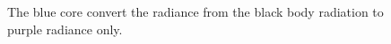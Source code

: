 \begin{figure}[h!]
\centering
{}
\caption
{
\label{fig:fire4}
The blue core convert the radiance from the black body radiation to purple radiance only.   
}
\end{figure}

